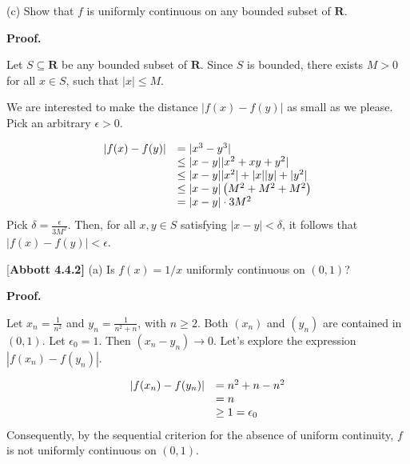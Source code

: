 \documentclass[10pt]{article}
\begin{document}
(c) Show that $\displaystyle f$ is uniformly continuous on any bounded subset of $\displaystyle \mathbf{R}$.



\textbf{Proof.} 



Let $\displaystyle S\subseteq \mathbf{R}$ be any bounded subset of $\displaystyle \mathbf{R}$. Since $\displaystyle S$ is bounded, there exists $\displaystyle M >0$ for all $\displaystyle x\in S$, such that $\displaystyle |x|\leq M$.



We are interested to make the distance $\displaystyle |f( x) -f( y) |$ as small as we please. Pick an arbitrary $\displaystyle \epsilon  >0$.




\begin{equation*}
\begin{array}{ c l }
|f( x) -f( y) | & =|x^{3} -y^{3} |\\
 & \leq |x-y||x^{2} +xy+y^{2} |\\
 & \leq |x-y||x^{2} |+|x||y|+|y^{2} |\\
 & \leq |x-y|\left( M^{2} +M^{2} +M^{2}\right)\\
 & =|x-y|\cdot 3M^{2}
\end{array}
\end{equation*}
Pick $\displaystyle \delta =\frac{\epsilon }{3M^{2}}$. Then, for all $\displaystyle x,y\in S$ satisfying $\displaystyle |x-y|< \delta $, it follows that $\displaystyle |f( x) -f( y) |< \epsilon $.



[\textbf{Abbott 4.4.2] }(a) Is $\displaystyle f( x) =1/x$ uniformly continuous on $\displaystyle ( 0,1)$?



\textbf{Proof.}



Let $\displaystyle x_{n} =\frac{1}{n^{2}}$ and $\displaystyle y_{n} =\frac{1}{n^{2} +n}$, with $\displaystyle n\geq 2$. Both $\displaystyle ( x_{n})$ and $\displaystyle ( y_{n})$ are contained in $\displaystyle ( 0,1)$. Let $\displaystyle \epsilon _{0} =1$. Then $\displaystyle ( x_{n} -y_{n})\rightarrow 0$. Let's explore the expression $\displaystyle |f( x_{n}) -f( y_{n}) |$.


\begin{equation*}
\begin{array}{ c l }
|f( x_{n}) -f( y_{n}) | & =n^{2} +n-n^{2}\\
 & =n\\
 & \geq 1=\epsilon _{0}
\end{array}
\end{equation*}
Consequently, by the sequential criterion for the absence of uniform continuity, $\displaystyle f$ is not uniformly continuous on $\displaystyle ( 0,1)$.
\end{document}
